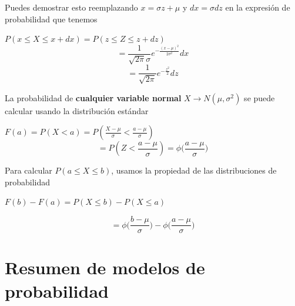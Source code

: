 \documentclass[
]{book}
\begin{document}
Puedes demostrar esto reemplazando \(x=\sigma z+\mu\) y \(dx=\sigma dz\) en la expresión de probabilidad que tenemos

\(P(x\leq X \leq x +dx)=P(z\leq Z \leq z +dz)\)
\[=\frac{1}{\sqrt{2\pi}\sigma}e^{-\frac{(x-\mu)^2}{2\sigma^2}}dx\] \[=\frac{1}{ \sqrt{2\pi}}e^{-\frac{z^2}{2}} dz\]

La probabilidad de \textbf{cualquier variable normal} \(X\rightarrow N(\mu, \sigma^2)\) se puede calcular usando la distribución estándar

\(F(a)=P(X<a)=P(\frac{X-\mu}{\sigma}<\frac{a-\mu}{\sigma})\)
\[=P(Z < \frac{a-\mu}{\sigma})= \phi \big(\frac{a-\mu}{\sigma}\big)\]

Para calcular \(P(a\leq X \leq b)\), usamos la propiedad de las distribuciones de probabilidad

\(F(b)-F(a)=P(X\leq b)-P(X\leq a)\)

\[=\phi \big(\frac{b-\mu}{\sigma}\big)-\phi \big(\frac{a-\mu}{\sigma}\big)\]

\hypertarget{resumen-de-modelos-de-probabilidad}{%
\section{Resumen de modelos de probabilidad}\label{resumen-de-modelos-de-probabilidad}}
\end{document}
